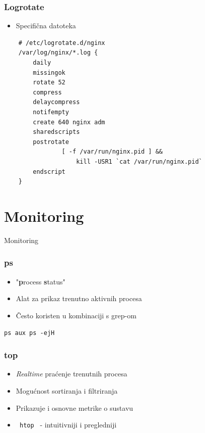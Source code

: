 \documentclass[t,table,usenames,dvipsnames]{beamer}
\newcommand{\shell}[1]{\texttt{#1}}
\begin{document}
\begin{frame}[fragile]
    \frametitle{Logrotate}
    \begin{itemize}
        \item Specifična datoteka
    \end{itemize}
    \begin{verbatim}
    # /etc/logrotate.d/nginx
    /var/log/nginx/*.log {
        daily
        missingok
        rotate 52
        compress
        delaycompress
        notifempty
        create 640 nginx adm
        sharedscripts
        postrotate
                [ -f /var/run/nginx.pid ] && 
                    kill -USR1 `cat /var/run/nginx.pid`
        endscript
    }

    \end{verbatim}

\end{frame}

\section{Monitoring}
\begin{frame}
    \vspace*{\fill}
        \begin{center}
            \Huge{Monitoring}
        \end{center}
    \vspace*{\fill}
\end{frame}


\begin{frame}
	\frametitle{ps}
	
	\begin{itemize}
		\item "\textbf{p}rocess \textbf{s}tatus"
		\item Alat za prikaz trenutno aktivnih procesa
		\item Često koristen u kombinaciji s grep-om
	\end{itemize}
		 \shell{ps aux  \newline
				ps -ejH}		
	
		
	
\end{frame}

\begin{frame}
	\frametitle{top}
	
	\begin{itemize}
		\item \textit{Realtime} praćenje trenutnih procesa
		\item Mogućnost sortiranja i filtriranja
		\item Prikazuje i osnovne metrike o sustavu
		\item \shell{ htop } - intuitivniji i pregledniji
	\end{itemize}
\end{frame}
\end{document}
